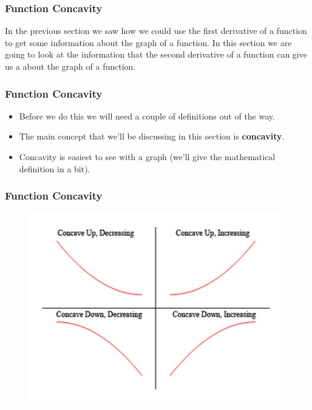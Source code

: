 \documentclass{beamer}
\begin{document}
	

\begin{frame} 
	\frametitle{Function Concavity}
 In the previous section we saw how we could use the first derivative of a function to get some information about the graph of a function.  In this section we are going to look at the information that the second derivative of a function can give us a about the graph of a function.
\end{frame}
\begin{frame} 
	\frametitle{Function Concavity}
	\begin{itemize}
 \item Before we do this we will need a couple of definitions out of the way.  
 \item The main concept that we’ll be discussing in this section is \textbf{concavity}. 
 \item  Concavity is easiest to see with a graph (we’ll give the mathematical definition in a bit).
 \end{itemize}

\end{frame}
\begin{frame} 
	\frametitle{Function Concavity}
	
	\begin{figure}
\centering
\includegraphics[width=0.99\linewidth]{CurveSketchingGraphs1/Slide5}
\end{figure}

\end{frame}
\end{document}
